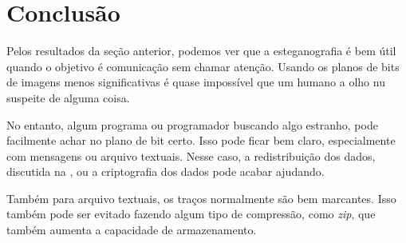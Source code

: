 \section{Conclusão}

Pelos resultados da seção anterior, podemos ver que a esteganografia é bem útil quando o objetivo é comunicação sem chamar atenção. Usando os planos de bits de imagens menos significativas é quase impossível que um humano a olho nu suspeite de alguma coisa.

No entanto, algum programa ou programador buscando algo estranho, pode facilmente achar no plano de bit certo. Isso pode ficar bem claro, especialmente com mensagens ou arquivo textuais. Nesse caso, a redistribuição dos dados, discutida na , ou a criptografia dos dados pode acabar ajudando.

Também para arquivo textuais, os traços normalmente são bem marcantes. Isso também pode ser evitado fazendo algum tipo de compressão, como \textit{zip}, que também aumenta a capacidade de armazenamento.
